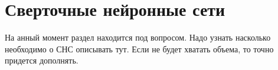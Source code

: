 \section{Сверточные нейронные сети}
\label{sec:Chapter1} 

На анный момент раздел находится под вопросом. Надо узнать насколько необходимо о СНС описывать тут. Если не будет хватать объема, то точно придется дополнять.

\newpage